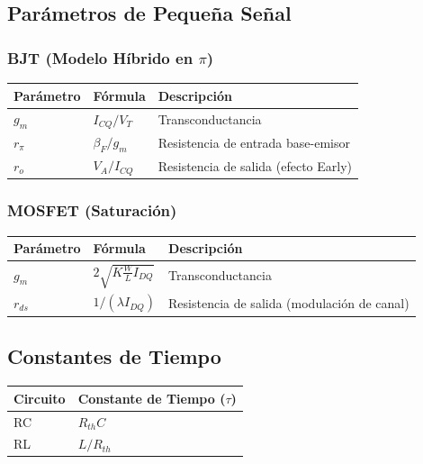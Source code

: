 \documentclass[11pt,a4paper]{article}
\begin{document}
\subsection*{Parámetros de Pequeña Señal}


\subsubsection*{BJT (Modelo Híbrido en $\pi$)}


\begin{center}
\begin{tabular}{@{}lll@{}}
\toprule
Parámetro & Fórmula & Descripción \\
\midrule
$g_m$ & $I_{CQ} / V_T$ & Transconductancia \\
$r_\pi$ & $\beta_F / g_m$ & Resistencia de entrada base-emisor \\
$r_o$ & $V_A / I_{CQ}$ & Resistencia de salida (efecto Early) \\
\bottomrule
\end{tabular}
\end{center}



\subsubsection*{MOSFET (Saturación)}


\begin{center}
\begin{tabular}{@{}lll@{}}
\toprule
Parámetro & Fórmula & Descripción \\
\midrule
$g_m$ & $2 \sqrt{K \frac{W}{L} I_{DQ}}$ & Transconductancia \\
$r_{ds}$ & $1 / (\lambda I_{DQ})$ & Resistencia de salida (modulación de canal) \\
\bottomrule
\end{tabular}
\end{center}



\subsection*{Constantes de Tiempo}


\begin{center}
\begin{tabular}{@{}ll@{}}
\toprule
Circuito & Constante de Tiempo ($\tau$) \\
\midrule
RC & $R_{th}C$ \\
RL & $L / R_{th}$ \\
\bottomrule
\end{tabular}
\end{center}
\end{document}
